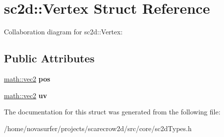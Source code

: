 \hypertarget{structsc2d_1_1Vertex}{}\section{sc2d\+:\+:Vertex Struct Reference}
\label{structsc2d_1_1Vertex}


Collaboration diagram for sc2d\+:\+:Vertex\+:
\subsection*{Public Attributes}
\begin{DoxyCompactItemize}
\item 
\mbox{\label{structsc2d_1_1Vertex_a01188c98be7ce285dce3d35e8c786e51}} 
\hyperlink{structmath_1_1vec2}{math\+::vec2} {\bfseries pos}
\item 
\mbox{\label{structsc2d_1_1Vertex_ab38c25d9d4d1d584927a1e7d498486fe}} 
\hyperlink{structmath_1_1vec2}{math\+::vec2} {\bfseries uv}
\end{DoxyCompactItemize}


The documentation for this struct was generated from the following file\+:\begin{DoxyCompactItemize}
\item 
/home/novasurfer/projects/scarecrow2d/src/core/sc2d\+Types.\+h\end{DoxyCompactItemize}
